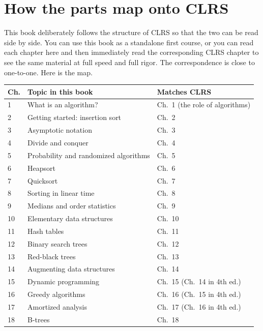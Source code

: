 \section*{How the parts map onto CLRS}

This book deliberately follows the structure of CLRS so that the two can be read
side by side. You can use this book as a standalone first course, or you can read
each chapter here and then immediately read the corresponding CLRS chapter to see
the same material at full speed and full rigor. The correspondence is close to
one-to-one. Here is the map.

\begin{longtable}{@{}p{}p{}p{}@{}}
\toprule
\textbf{Ch.} & \textbf{Topic in this book} & \textbf{Matches CLRS} \\
\midrule
\endhead
1  & What is an algorithm?                 & Ch.~1 (the role of algorithms) \\
2  & Getting started: insertion sort       & Ch.~2 \\
3  & Asymptotic notation                   & Ch.~3 \\
4  & Divide and conquer                    & Ch.~4 \\
5  & Probability and randomized algorithms & Ch.~5 \\
6  & Heapsort                              & Ch.~6 \\
7  & Quicksort                             & Ch.~7 \\
8  & Sorting in linear time                & Ch.~8 \\
9  & Medians and order statistics          & Ch.~9 \\
10 & Elementary data structures            & Ch.~10 \\
11 & Hash tables                           & Ch.~11 \\
12 & Binary search trees                   & Ch.~12 \\
13 & Red-black trees                       & Ch.~13 \\
14 & Augmenting data structures            & Ch.~14 \\
15 & Dynamic programming                   & Ch.~15 (Ch.~14 in 4th ed.) \\
16 & Greedy algorithms                     & Ch.~16 (Ch.~15 in 4th ed.) \\
17 & Amortized analysis                    & Ch.~17 (Ch.~16 in 4th ed.) \\
18 & B-trees                               & Ch.~18 \\

\end{longtable}
